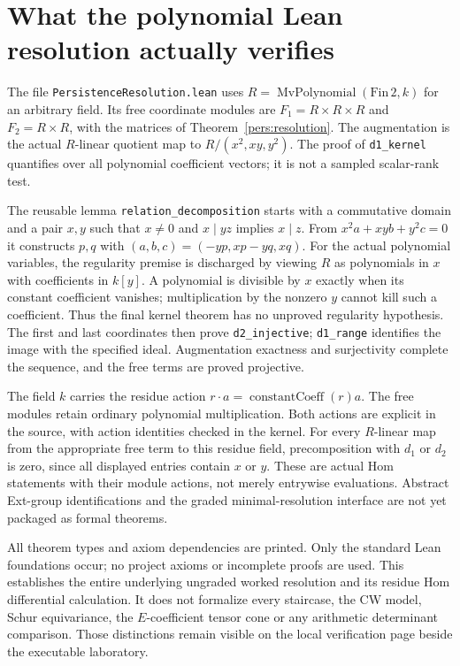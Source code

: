 \documentclass[11pt,oneside,openany]{book}
\theoremstyle{definition}\newtheorem{definition}[theorem]{Definition}
\theoremstyle{remark}\newtheorem{remark}[theorem]{Remark}
\begin{document}
\section{What the polynomial Lean resolution actually verifies}
The file \texttt{PersistenceResolution.lean} uses
$R=\operatorname{MvPolynomial}(\mathrm{Fin}\,2,k)$ for an arbitrary field.
Its free coordinate modules are $F_1=R\times R\times R$ and
$F_2=R\times R$, with the matrices of Theorem~\ref{pers:resolution}.
The augmentation is the actual $R$-linear quotient map to
$R/(x^2,xy,y^2)$. The proof of \texttt{d1\_kernel} quantifies over
all polynomial coefficient vectors; it is not a sampled scalar-rank test.

The reusable lemma \texttt{relation\_decomposition} starts with a
commutative domain and a pair $x,y$ such that $x\ne0$ and
$x\mid yz$ implies $x\mid z$. From
$x^2a+xyb+y^2c=0$ it constructs $p,q$ with
$(a,b,c)=(-yp,xp-yq,xq)$. For the actual polynomial variables, the
regularity premise is discharged by viewing $R$ as polynomials in $x$
with coefficients in $k[y]$. A polynomial is divisible by $x$ exactly
when its constant coefficient vanishes; multiplication by the nonzero
$y$ cannot kill such a coefficient. Thus the final kernel theorem has
no unproved regularity hypothesis. The first and last coordinates then
prove \texttt{d2\_injective}; \texttt{d1\_range} identifies the image
with the specified ideal. Augmentation exactness and surjectivity complete
the sequence, and the free terms are proved projective.

The field $k$ carries the residue action
$r\cdot a=\operatorname{constantCoeff}(r)a$.
The free modules retain ordinary polynomial multiplication. Both actions
are explicit in the source, with action identities checked in the kernel.
For every $R$-linear map from the appropriate free term to this residue
field, precomposition with $d_1$ or $d_2$ is zero, since all displayed
entries contain $x$ or $y$. These are actual Hom statements with their
module actions, not merely entrywise evaluations. Abstract Ext-group
identifications and the graded minimal-resolution interface are not yet
packaged as formal theorems.

All theorem types and axiom dependencies are printed. Only the standard
Lean foundations occur; no project axioms or incomplete proofs are used.
This establishes the entire underlying ungraded worked resolution and its
residue Hom differential calculation. It does not formalize every staircase,
the CW model, Schur equivariance, the $E$-coefficient tensor cone or any
arithmetic determinant comparison. Those distinctions remain visible on
the local verification page beside the executable laboratory.
\end{document}
